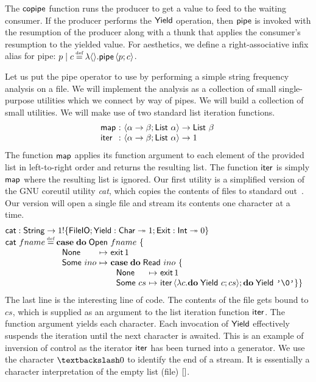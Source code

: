 \documentclass[12pt,phd,lfcs,twoside,openright,logo,leftchapter,normalheadings]{infthesis}
\theoremstyle{plain}
\theoremstyle{definition}
\begin{document}
The $\mathsf{copipe}$ function runs the producer to get a value to feed to the
waiting consumer.
If the producer performs the $\mathsf{Yield}$ operation, then $\mathsf{pipe}$ is
invoked with the resumption of the producer along with a thunk that
applies the consumer's resumption to the yielded value.
%
For aesthetics, we define a right-associative infix alias for pipe:
$p \mid c \defas \lambda\Unit.\Pipe\,\Record{p;c}$.

Let us put the pipe operator to use by performing a simple string
frequency analysis on a file. We will implement the analysis as a
collection of small single-purpose utilities which we connect by way
of pipes. We will build a collection of small utilities. We will make
use of two standard list iteration functions.
%
\[
  \ba{@{~}l@{~}c@{~}l}
    \map   &:& \Record{\alpha \to \beta;\List~\alpha} \to \List~\beta\\
    \iter  &:& \Record{\alpha \to \beta; \List~\alpha} \to \UnitType
  \ea
\]
%
The function $\mathsf{map}$ applies its function argument to each element of
the provided list in left-to-right order and returns the resulting
list. The function $\mathsf{iter}$ is simply $\mathsf{map}$ where the resulting list
is ignored. Our first utility is a simplified version of the GNU
coreutil utility \emph{cat}, which copies the contents of files to
standard out~\cite[Section~3.1]{MacKenzieMPPBYS20}. Our version will
open a single file and stream its contents one character at a time.
%
\[
  \bl
    \cat : \String \to \UnitType \eff \{\FileIO;\Yield : \Char \opto \UnitType;\Exit : \Int \opto \ZeroType\}\\
    \cat~fname \defas
      \bl
        \Case\;\Do\;\UOpen~fname~\{\\
        ~\ba[t]{@{~}l@{~}c@{~}l}
           \None &\mapsto& \exit\,1\\
           \Some~ino &\mapsto& \bl \Case\;\Do\;\URead~ino~\{\\
                                  ~\ba[t]{@{~}l@{~}c@{~}l}
                                     \None &\mapsto& \exit\,1\\
                                     \Some~cs &\mapsto& \iter\,\Record{\lambda c.\Do\;\Yield~c;cs}; \Do\;\Yield~\charlit{\textnil} \}\}
                                   \ea
                               \el
         \ea
      \el
  \el
\]
%
The last line is the interesting line of code. The contents of the
file gets bound to $cs$, which is supplied as an argument to the list
iteration function $\mathsf{iter}$. The function argument yields each
character. Each invocation of $\mathsf{Yield}$ effectively suspends the
iteration until the next character is awaited.
%
This is an example of inversion of control as the iterator $\mathsf{iter}$ has
been turned into a generator.
%
We use the character $\textnil$ to identify the end of a stream. It is
essentially a character interpretation of the empty list (file)
$[]$.
\end{document}
